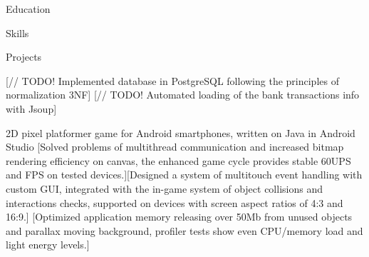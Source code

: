 \documentclass[10pt,a4paper,oneside]{letter} %
\begin{document}
	
	
	\begin{contactinfo}
	\end{contactinfo}
	
	\begin{resumeSection}{Education}


	\end{resumeSection}
	
	\begin{resumeSection}{Skills}

	\end{resumeSection}
	
	\begin{resumeSection}{Projects}

		[// TODO! Implemented database in PostgreSQL following the principles of normalization 3NF]
		[// TODO! Automated loading of the bank transactions info with Jsoup]
	    
			{2D pixel platformer game for Android smartphones, written on Java in Android Studio}
			[Solved problems of multithread communication and increased bitmap rendering efficiency on canvas, the enhanced game cycle provides stable 60UPS and FPS on tested devices.][Designed a system of multitouch event handling with custom GUI, integrated with the in-game system of object collisions and interactions checks, supported on devices with screen aspect ratios of 4:3 and 16:9.]
			[Optimized application memory releasing over 50Mb from unused objects and parallax moving background, profiler tests show even CPU/memory load and light energy levels.]
	\end{resumeSection}
	
\end{document}
